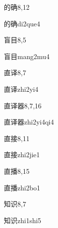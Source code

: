 \begin{entry}{的确}{8,12}
  \begin{phonetics}{的确}{di2que4}
  \end{phonetics}
\end{entry}

\begin{entry}{盲目}{8,5}
  \begin{phonetics}{盲目}{mang2mu4}
  \end{phonetics}
\end{entry}

\begin{entry}{直译}{8,7}
  \begin{phonetics}{直译}{zhi2yi4}
  \end{phonetics}
\end{entry}

\begin{entry}{直译器}{8,7,16}
  \begin{phonetics}{直译器}{zhi2yi4qi4}
  \end{phonetics}
\end{entry}

\begin{entry}{直接}{8,11}
  \begin{phonetics}{直接}{zhi2jie1}
  \end{phonetics}
\end{entry}

\begin{entry}{直播}{8,15}
  \begin{phonetics}{直播}{zhi2bo1}
  \end{phonetics}
\end{entry}

\begin{entry}{知识}{8,7}
  \begin{phonetics}{知识}{zhi1shi5}
  \end{phonetics}
\end{entry}

